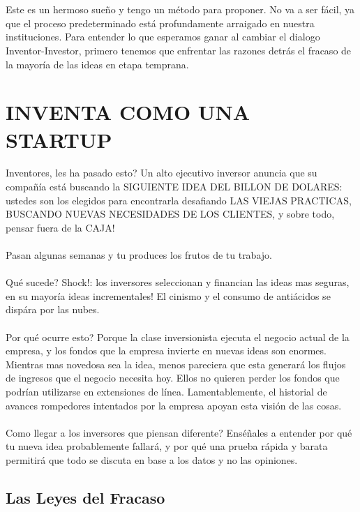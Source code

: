 \documentclass{article}
\begin{document}
\\ \\
Este es un hermoso sue\~no y tengo un m\'etodo para proponer. No va a ser f\'acil, ya que el proceso predeterminado est\'a profundamente arraigado en nuestra instituciones. Para entender lo que esperamos ganar al cambiar el dialogo Inventor-Investor, primero tenemos que enfrentar las razones detr\'as el fracaso de la mayor\'ia de las ideas en etapa temprana.

\clearpage
\section{INVENTA COMO UNA STARTUP}

Inventores, les ha pasado esto? Un alto ejecutivo inversor anuncia que su compa\~n\'ia est\'a buscando la SIGUIENTE IDEA DEL BILLON DE DOLARES: ustedes son los elegidos para encontrarla desafiando LAS VIEJAS PRACTICAS, BUSCANDO NUEVAS NECESIDADES DE LOS CLIENTES, y sobre todo, pensar fuera de la CAJA!
\\ \\
Pasan algunas semanas y tu produces los frutos de tu trabajo.
\\ \\
Qu\'e sucede? Shock!: los inversores seleccionan y financian las ideas mas seguras, en su mayor\'ia ideas incrementales! El cinismo y el consumo de anti\'acidos se disp\'ara por las nubes.
\\ \\
Por qu\'e ocurre esto? Porque la clase inversionista ejecuta el negocio actual de la empresa, y los fondos que la empresa invierte en nuevas ideas son enormes. Mientras mas novedosa sea la idea, menos pareciera que esta generar\'a los flujos de ingresos que el negocio necesita hoy. Ellos no quieren perder los fondos que podr\'ian utilizarse en extensiones de l\'inea. Lamentablemente, el historial de avances rompedores intentados por la empresa apoyan esta visi\'on de las cosas.
\\ \\
Como llegar a los inversores que piensan diferente? Ens\'e\~nales a entender por qu\'e tu nueva idea probablemente fallar\'a, y por qu\'e una prueba r\'apida y barata permitir\'a que todo se discuta en base a los datos y no las opiniones.

\subsection{Las Leyes del Fracaso}
\end{document}
